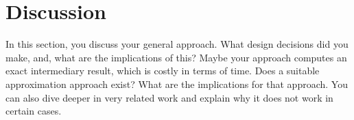 \chapter{Discussion}
\label{chap:discussion}

In this section, you discuss your general approach.
What design decisions did you make, and, what are the implications of this?
Maybe your approach computes an exact intermediary result, which is costly in terms of time.
Does a suitable approximation approach exist?
What are the implications for that approach.
You can also dive deeper in very related work and explain why it does not work in certain cases.
